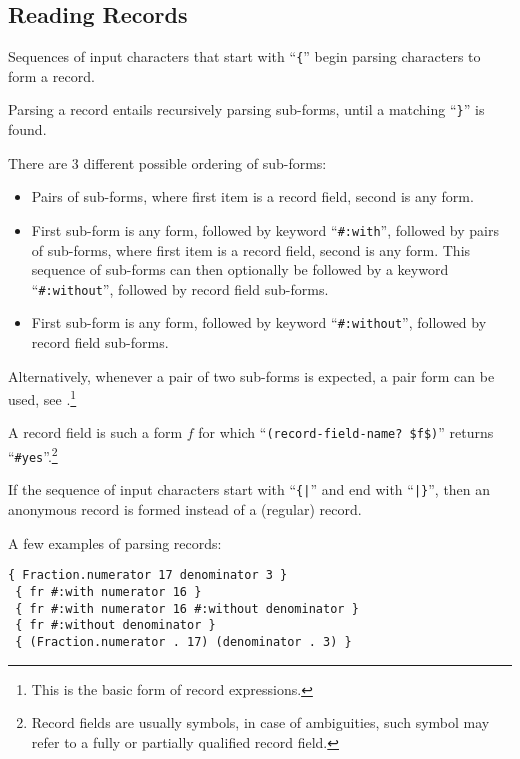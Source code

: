 \subsection{Reading Records}
\label{subsec:aml-base-lang-reader-records}

Sequences of input characters that start with ``\lstinline!{!'' begin parsing characters to form a record.

Parsing a record entails recursively parsing sub-forms, until a matching ``\lstinline!}!'' is found. 

There are 3 different possible ordering of sub-forms:
\begin{itemize}
  \item Pairs of sub-forms, where first item is a record field, second is any form.
  \item First sub-form is any form, followed by keyword ``\lstinline!#:with!'', followed by pairs of sub-forms, where first item is a record field, second is any form. This sequence of sub-forms can then optionally be followed by a keyword ``\lstinline!#:without!'', followed by record field sub-forms.
  \item First sub-form is any form, followed by keyword ``\lstinline!#:without!'', followed by record field sub-forms.
\end{itemize}

Alternatively, whenever a pair of two sub-forms is expected, a pair form can be used, see .\footnote{This is the basic form of record expressions.}

A record field is such a form $f$ for which ``\lstinline!(record-field-name? $f$)!'' returns ``\lstinline!#yes!''.\footnote{Record fields are usually symbols, in case of ambiguities, such symbol may refer to a fully or partially qualified record field.}

If the sequence of input characters start with ``\lstinline!{|!'' and end with ``\lstinline!|}!'', then an anonymous record is formed instead of a (regular) record.

\example A few examples of parsing records:

\begin{lstlisting}[deletekeywords={with,without}]
 { Fraction.numerator 17 denominator 3 }
 { fr #:with numerator 16 }
 { fr #:with numerator 16 #:without denominator }
 { fr #:without denominator }
 { (Fraction.numerator . 17) (denominator . 3) }
\end{lstlisting}







